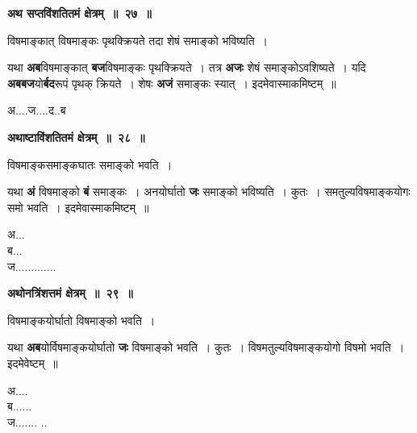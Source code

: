 \documentclass[11pt, openany]{book}
\begin{document}
\begin{center}
\textbf{\large अथ सप्तविंशतितमं क्षेत्रम्~॥~२७~॥} 
\end{center}

{\ab  विषमाङ्कात् विषमाङ्कः पृथक्क्रियते तदा शेषं समाङ्को भविष्यति~। }

\begin{flushleft}
\begin{minipage}[t]{0.7\textwidth}
\hspace{4mm}  यथा \textbf{अब}विषमाङ्कात् \textbf{बज}विषमाङ्कः पृथक्क्रियते~। तत्र \textbf{अजः} शेषं समाङ्कोऽवशिष्यते~। यदि \textbf{अबबज}यो\textbf{र्बद}रूपं पृथक् क्रियते~। शेषः \textbf{अजं} समाङ्कः स्यात्~। इदमेवास्माकमिष्टम्~॥
\end{minipage} 
\hfill
\begin{minipage}[t]{0.2\textwidth}
 अ....ज....द..ब
\end{minipage}
\end{flushleft}
\vspace{-1mm}

\begin{center}
\textbf{\large अथाष्टाविंशतितमं क्षेत्रम्~॥~२८~॥} 
\end{center}

{\ab विषमाङ्कसमाङ्कघातः समाङ्को भवति~। }

\begin{flushleft}
\begin{minipage}[t]{0.7\textwidth}
\hspace{4mm}  यथा \textbf{अं} विषमाङ्को \textbf{बं} समाङ्कः~। अनयोर्घातो \textbf{जः} समाङ्को भविष्यति~। कुतः~। समतुल्यविषमाङ्कयोगः समो भवति~। इदमेवास्माकमिष्टम्~॥
\end{minipage} 
\hfill
\begin{minipage}[t]{0.2\textwidth}
अ... \\
ब...\\
ज.............
\end{minipage}
\end{flushleft}
\vspace{-1mm}

\begin{center}
\textbf{\large अथोनत्रिंशत्तमं क्षेत्रम्~॥~२९~॥}
\end{center}

{\ab  विषमाङ्कयोर्घातो विषमाङ्को भवति~। }

\begin{flushleft}
\begin{minipage}[t]{0.7\textwidth}
\hspace{4mm} यथा \textbf{अब}योर्विषमाङ्कयोर्घातो \textbf{जः} विषमाङ्को भवति~। कुतः~। विषमतुल्यविषमाङ्कयोगो विषमो भवति~। इदमेवेष्टम्~॥
\end{minipage} 
\hfill
\begin{minipage}[t]{0.2\textwidth}
\vspace{-6mm}

अ....\\
ब...... \\
ज....... ..
\end{minipage}
\end{flushleft}
\end{document}
